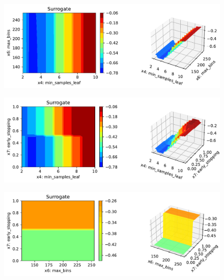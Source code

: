 \documentclass[
  letterpaper,
  DIV=11,
  numbers=noendperiod]{scrreprt}
\begin{document}
\begin{figure}[H]

{\centering \includegraphics{17_spot_hpt_sklearn_multiclass_classification_xgb_files/figure-pdf/cell-46-output-9.pdf}

}

\end{figure}

\begin{figure}[H]

{\centering \includegraphics{17_spot_hpt_sklearn_multiclass_classification_xgb_files/figure-pdf/cell-46-output-10.pdf}

}

\end{figure}

\begin{figure}[H]

{\centering \includegraphics{17_spot_hpt_sklearn_multiclass_classification_xgb_files/figure-pdf/cell-46-output-11.pdf}

}

\end{figure}
\end{document}
